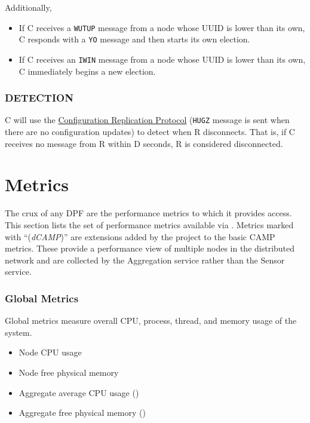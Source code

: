 Additionally,

\begin{itemize}
\item If C receives a \texttt{WUTUP} message from a node whose UUID is lower than its own, C responds with a \texttt{YO}
      message and then starts its own election.
\item If C receives an \texttt{IWIN} message from a node whose UUID is lower than its own, C immediately begins a new
      election.
\end{itemize}

\subsubsection{DETECTION}

C will use the \hyperref[proto_config]{Configuration Replication Protocol} (\texttt{HUGZ} message is sent when there are
no configuration updates) to detect when R disconnects. That is, if C receives no message from R within D seconds, R is
considered disconnected.

\section{\dcamp Metrics}
\label{dcamp_metrics}

The crux of any DPF are the performance metrics to which it provides access. This section lists the set of performance
metrics available via \dcamp. Metrics marked with ``(\emph{dCAMP})'' are extensions added by the \dcamp project to the
basic CAMP metrics. These provide a performance view of multiple nodes in the distributed network and are collected by
the Aggregation service rather than the Sensor service.

\subsubsection{Global Metrics}
Global metrics measure overall CPU, process, thread, and memory usage of the system.
\begin{itemize}
\item Node CPU usage
\item Node free physical memory
\item Aggregate average CPU usage (\dcamp)
\item Aggregate free physical memory (\dcamp)
\end{itemize}


